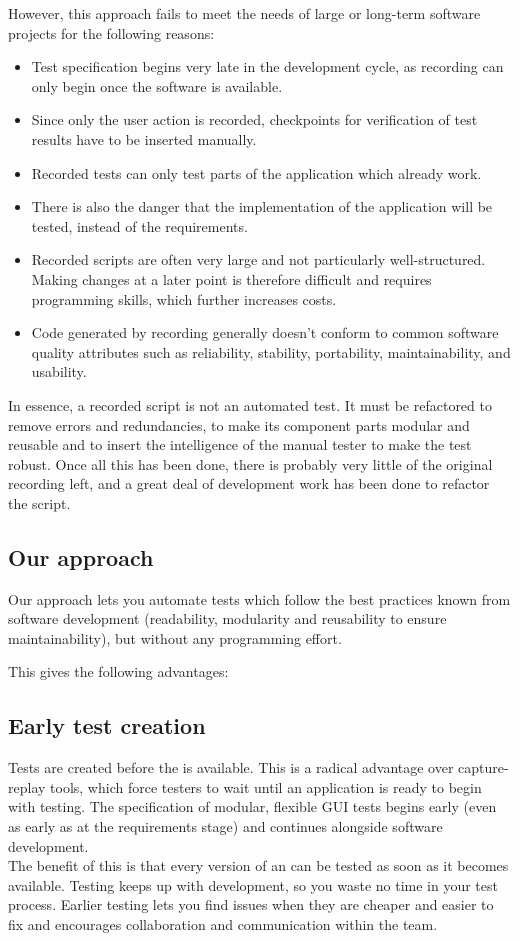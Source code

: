 However, this approach fails to meet the needs of large or long-term software projects for the following reasons:

\begin{itemize}
\item Test specification begins very late in the development cycle,
 as recording can only begin once the software is available. 
\item Since only the user action is recorded, checkpoints for verification
of test results have to be inserted manually.
\item Recorded tests can only test parts of the application which already work. \item There is also the danger that the implementation of the application will be tested, instead of the requirements. 
\item Recorded scripts are often very large and not particularly 
well-structured. Making changes at a later point is therefore 
difficult and requires programming skills, which further increases costs.  
\item Code generated by recording generally doesn't conform to
 common software quality attributes such as reliability, stability, 
portability, maintainability, and usability.
\end{itemize}

In essence, a recorded script is not an automated test. It must be refactored to remove errors and redundancies, to make its component parts modular and reusable and to insert the intelligence of the manual tester to make the test robust. Once all this has been done, there is probably very little of the original recording left, and a great deal of development work has been done to refactor the script.  


\subsection{Our approach}
\label{JBApproach}
Our approach lets you automate tests which follow the best practices known from software development (readability, modularity and reusability to ensure maintainability), but without any programming effort. 


This gives the following advantages: 

\subsection{Early test creation}

Tests are created before the \gdaut{} is available. This is a radical advantage over capture-replay tools, which force testers to wait until an application is ready to begin with testing. The specification of modular, flexible GUI tests begins early (even as early as at the requirements stage) and continues alongside software development.\\ 
The benefit of this is that every version of an \gdaut{} can be tested as soon as it becomes available. Testing keeps up with development, so you waste no time in your test process. Earlier testing lets you find issues when they are cheaper and easier to fix and encourages collaboration and communication within the team.

